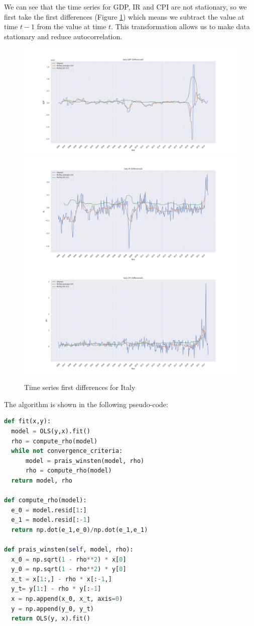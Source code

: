 We can see that the time series for GDP, IR and CPI are not stationary, so we first take the first differences (Figure \ref{fig:italy_diff}) which means we subtract the value at time $t-1$ from the value at time $t$. This transformation allows us to make data stationary and reduce autocorrelation.

\begin{figure}[H]
  \includegraphics[width=.9\linewidth]{imgs/italy_gdp_diff.png}
  \includegraphics[width=.9\linewidth]{imgs/italy_ir_diff.png}
  \includegraphics[width=.9\linewidth]{imgs/italy_cpi_diff.png}
  \caption{Time series first differences for Italy}
  \label{fig:italy_diff}
\end{figure}

The algorithm is shown in the following pseudo-code:
\begin{lstlisting}[language=Python]
def fit(x,y):
  model = OLS(y,x).fit()
  rho = compute_rho(model)
  while not convergence_criteria:
      model = prais_winsten(model, rho)
      rho = compute_rho(model)
  return model, rho

def compute_rho(model):
  e_0 = model.resid[1:]
  e_1 = model.resid[:-1]
  return np.dot(e_1,e_0)/np.dot(e_1,e_1)

def prais_winsten(self, model, rho):
  x_0 = np.sqrt(1 - rho**2) * x[0]
  y_0 = np.sqrt(1 - rho**2) * y[0]
  x_t = x[1:,] - rho * x[:-1,]
  y_t= y[1:] - rho * y[:-1]
  x = np.append(x_0, x_t, axis=0)
  y = np.append(y_0, y_t)
  return OLS(y, x).fit()
\end{lstlisting}

